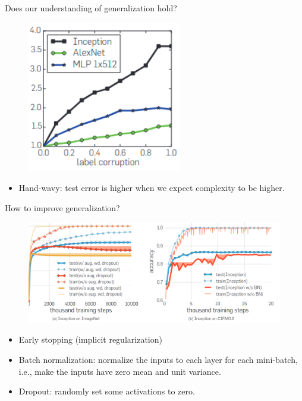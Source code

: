 \documentclass[final]{beamer}
\begin{document}
\begin{frame}{Does our understanding of generalization hold?}
\begin{figure}
\includegraphics[width=0.6\textwidth]{trainingTime.png}
\end{figure}

\begin{itemize}
	\item Hand-wavy: test error is higher when we expect complexity to be higher.

\end{itemize}

\end{frame}
\begin{frame}{How to improve generalization?}
	\begin{figure}
		\includegraphics[width=\textwidth]{effectOfRegularization.png}
	\end{figure}
	\begin{itemize}
		\item Early stopping (implicit regularization)
		\pause
		\item Batch normalization: normalize the inputs to each layer for each mini-batch, i.e., make the inputs have zero mean and unit variance.
		\pause
		\item Dropout: randomly set some activations to zero. 
	\end{itemize}

\end{frame}
\end{document}
